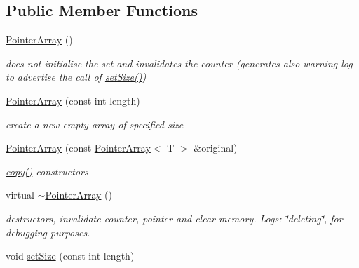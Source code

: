 \subsection*{Public Member Functions}
\begin{DoxyCompactItemize}
\item 
\hypertarget{classplist_1_1PointerArray_a8695d3709a6db7a3de08c9f28881d93b}{\hyperlink{classplist_1_1PointerArray_a8695d3709a6db7a3de08c9f28881d93b}{Pointer\-Array} ()}\label{classplist_1_1PointerArray_a8695d3709a6db7a3de08c9f28881d93b}

\begin{DoxyCompactList}\small\item\em does not initialise the set and invalidates the counter (generates also warning log to advertise the call of \hyperlink{classplist_1_1PointerArray_ad3e1dffcca6e72459ed7b8983ba1986d}{set\-Size()}) \end{DoxyCompactList}\item 
\hypertarget{classplist_1_1PointerArray_a6f9ce497535e0ccf4572631d76f5a561}{\hyperlink{classplist_1_1PointerArray_a6f9ce497535e0ccf4572631d76f5a561}{Pointer\-Array} (const int length)}\label{classplist_1_1PointerArray_a6f9ce497535e0ccf4572631d76f5a561}

\begin{DoxyCompactList}\small\item\em create a new empty array of specified size \end{DoxyCompactList}\item 
\hypertarget{classplist_1_1PointerArray_ae78df48ab8e16299cf15c25466081f60}{\hyperlink{classplist_1_1PointerArray_ae78df48ab8e16299cf15c25466081f60}{Pointer\-Array} (const \hyperlink{classplist_1_1PointerArray}{Pointer\-Array}$<$ T $>$ \&original)}\label{classplist_1_1PointerArray_ae78df48ab8e16299cf15c25466081f60}

\begin{DoxyCompactList}\small\item\em \hyperlink{classplist_1_1PointerArray_a02260685c3904a903dafabe72b03b0c1}{copy()} constructors \end{DoxyCompactList}\item 
\hypertarget{classplist_1_1PointerArray_a6729f5f19936628a121bba8d5e543555}{virtual \hyperlink{classplist_1_1PointerArray_a6729f5f19936628a121bba8d5e543555}{$\sim$\-Pointer\-Array} ()}\label{classplist_1_1PointerArray_a6729f5f19936628a121bba8d5e543555}

\begin{DoxyCompactList}\small\item\em destructors, invalidate counter, pointer and clear memory. Logs\-: \char`\"{}deleting\char`\"{}, for debugging purposes. \end{DoxyCompactList}\item 
\hypertarget{classplist_1_1PointerArray_ad3e1dffcca6e72459ed7b8983ba1986d}{void \hyperlink{classplist_1_1PointerArray_ad3e1dffcca6e72459ed7b8983ba1986d}{set\-Size} (const int length)}\label{classplist_1_1PointerArray_ad3e1dffcca6e72459ed7b8983ba1986d}


\end{DoxyCompactItemize}
